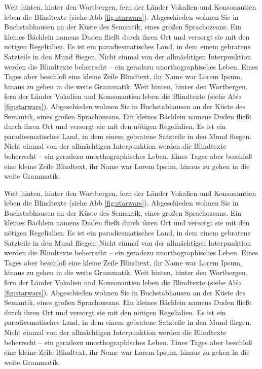 Weit hinten, hinter den Wortbergen, fern der Länder Vokalien und Konsonantien leben die Blindtexte (siehe Abb \ref{fig:starwars}). Abgeschieden wohnen Sie in Buchstabhausen an der Küste des Semantik, eines großen Sprachozeans. Ein kleines Bächlein namens Duden fließt durch ihren Ort und versorgt sie mit den nötigen Regelialien. Es ist ein paradiesmatisches Land, in dem einem gebratene Satzteile in den Mund fliegen. Nicht einmal von der allmächtigen Interpunktion werden die Blindtexte beherrscht – ein geradezu unorthographisches Leben. Eines Tages aber beschloß eine kleine Zeile Blindtext, ihr Name war Lorem Ipsum, hinaus zu gehen in die weite Grammatik.
Weit hinten, hinter den Wortbergen, fern der Länder Vokalien und Konsonantien leben die Blindtexte (siehe Abb \ref{fig:starwars}). Abgeschieden wohnen Sie in Buchstabhausen an der Küste des Semantik, eines großen Sprachozeans. Ein kleines Bächlein namens Duden fließt durch ihren Ort und versorgt sie mit den nötigen Regelialien. Es ist ein paradiesmatisches Land, in dem einem gebratene Satzteile in den Mund fliegen. Nicht einmal von der allmächtigen Interpunktion werden die Blindtexte beherrscht – ein geradezu unorthographisches Leben. Eines Tages aber beschloß eine kleine Zeile Blindtext, ihr Name war Lorem Ipsum, hinaus zu gehen in die weite Grammatik.

Weit hinten, hinter den Wortbergen, fern der Länder Vokalien und Konsonantien leben die Blindtexte (siehe Abb \ref{fig:starwars}). Abgeschieden wohnen Sie in Buchstabhausen an der Küste des Semantik, eines großen Sprachozeans. Ein kleines Bächlein namens Duden fließt durch ihren Ort und versorgt sie mit den nötigen Regelialien. Es ist ein paradiesmatisches Land, in dem einem gebratene Satzteile in den Mund fliegen. Nicht einmal von der allmächtigen Interpunktion werden die Blindtexte beherrscht – ein geradezu unorthographisches Leben. Eines Tages aber beschloß eine kleine Zeile Blindtext, ihr Name war Lorem Ipsum, hinaus zu gehen in die weite Grammatik.
Weit hinten, hinter den Wortbergen, fern der Länder Vokalien und Konsonantien leben die Blindtexte (siehe Abb \ref{fig:starwars}). Abgeschieden wohnen Sie in Buchstabhausen an der Küste des Semantik, eines großen Sprachozeans. Ein kleines Bächlein namens Duden fließt durch ihren Ort und versorgt sie mit den nötigen Regelialien. Es ist ein paradiesmatisches Land, in dem einem gebratene Satzteile in den Mund fliegen. Nicht einmal von der allmächtigen Interpunktion werden die Blindtexte beherrscht – ein geradezu unorthographisches Leben. Eines Tages aber beschloß eine kleine Zeile Blindtext, ihr Name war Lorem Ipsum, hinaus zu gehen in die weite Grammatik.

